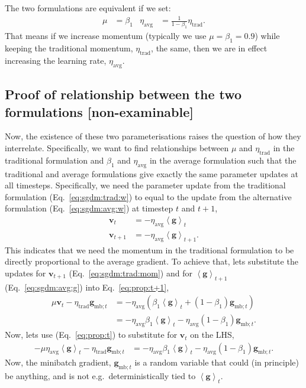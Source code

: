 \documentclass{article}
\newcommand{\bracket}[3]{\left#1 #3 \right#2}
\newcommand{\ab}{\bracket{\langle}{\rangle}}
\renewcommand{\b}{\bracket{(}{)}}
\newcommand{\0}{\mathbf{0}}
\newcommand{\g}{\mathbf{g}}
\newcommand{\mom}{\mathbf{v}}
\newcommand{\gmbt}{\g_{\text{mb}; t}}
\newcommand{\gb}{\mathbf{\ab{g}}}
\newcommand{\lrtrad}{\eta_\text{trad}}
\newcommand{\lravg}{\eta_\text{avg}}
\begin{document}
The two formulations are equivalent if we set:
\begin{align}
  \mu &= \beta_1 &
  \lravg &= \tfrac{1}{1 -\beta_1} \lrtrad.
\end{align}
That means if we increase momentum (typically we use $\mu=\beta_1=0.9$) while keeping the traditional momentum, $\lrtrad$, the same, then we are in effect increasing the learning rate, $\lravg$.

\subsection{Proof of relationship between the two formulations [non-examinable]}

Now, the existence of these two parameterisations raises the question of how they interrelate.
Specifically, we want to find relationships between $\mu$ and $\lrtrad$ in the traditional formulation and $\beta_1$ and $\lravg$ in the average formulation such that the traditional and average formulations give exactly the same parameter updates at all timesteps.
Specifically, we need the parameter update from the traditional formulation (Eq.~\ref{eq:sgdm:trad:w}) to equal to the update from the alternative formulation (Eq.~\ref{eq:sgdm:avg:w}) at timestep $t$ and $t+1$,
\begin{subequations}
\begin{align}
  \label{eq:prop:t}
  \mom_{t} &= - \lravg \gb_{t} \\
  \label{eq:prop:t+1}
  \mom_{t+1} &= - \lravg \gb_{t+1}.
\end{align}
\end{subequations}
This indicates that we need the momentum in the traditional formulation to be directly proportional to the average gradient.
To achieve that, lets substitute the updates for $\mom_{t+1}$ (Eq.~\ref{eq:sgdm:trad:mom}) and for $\gb_{t+1}$ (Eq.~\ref{eq:sgdm:avg:g}) into Eq.~\eqref{eq:prop:t+1},
\begin{align}
  \nonumber
  \mu \mom_t - \lrtrad \gmbt &= - \lravg \b{\beta_1 \gb_t + (1-\beta_1) \gmbt} \\
  &= - \lravg \beta_1 \gb_t - \lravg (1-\beta_1) \gmbt.
\end{align}
Now, lets use (Eq.~\ref{eq:prop:t}) to substitute for $\mom_t$ on the LHS,
\begin{align}
  - \mu \lravg \gb_{t} - \lrtrad \gmbt &= - \lravg \beta_1 \gb_t - \lravg (1-\beta_1) \gmbt.
\end{align}
Now, the minibatch gradient, $\gmbt$ is a random variable that could (in principle) be anything, and is not e.g.\ deterministically tied to $\gb_t$.
\end{document}
